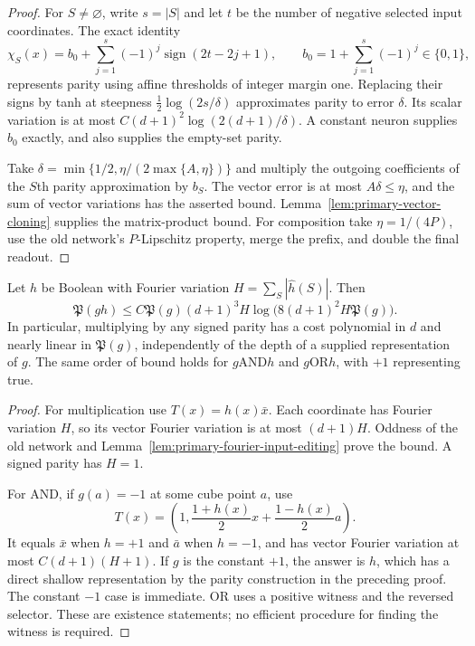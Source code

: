 \begin{proof}
For $S\ne\varnothing$, write $s=|S|$ and let $t$ be the number
of negative selected input coordinates. The exact identity
\[
 \chi_S(x)=b_0+\sum_{j=1}^{s}(-1)^j
                    \operatorname{sign}(2t-2j+1),
 \qquad b_0=1+\sum_{j=1}^{s}(-1)^j\in\{0,1\},
\]
represents parity using affine thresholds of integer margin one.
Replacing their signs by tanh at steepness
$\tfrac12\log(2s/\delta)$ approximates parity to error $\delta$.
Its scalar variation is at most
$C(d+1)^2\log(2(d+1)/\delta)$. A constant neuron supplies $b_0$
exactly, and also supplies the empty-set parity.

Take $\delta=\min\{1/2,\eta/(2\max\{A,\eta\})\}$ and
multiply the outgoing coefficients of the $S$th parity approximation
by $b_S$. The vector error is at most $A\delta\le\eta$, and
the sum of vector variations has the asserted bound.
Lemma~\ref{lem:primary-vector-cloning} supplies the matrix-product
bound. For composition take $\eta=1/(4P)$, use the old network's
$P$-Lipschitz property, merge the prefix, and double the final
readout.
\end{proof}

\begin{corollary}
\label{cor:primary-predicate-modulation}
Let $h$ be Boolean with Fourier variation
$H=\sum_S|\widehat h(S)|$. Then
\[
 \mathfrak P(gh)
 \le C\mathfrak P(g)(d+1)^3H
       \log\bigl(8(d+1)^2H\mathfrak P(g)\bigr).
\]
In particular, multiplying by any signed parity has a cost
polynomial in $d$ and nearly linear in $\mathfrak P(g)$,
independently of the depth of a supplied representation of $g$.
The same order of bound holds for $g\mathbin{\mathrm{AND}}h$
and $g\mathbin{\mathrm{OR}}h$, with $+1$ representing true.
\end{corollary}

\begin{proof}
For multiplication use $T(x)=h(x)\bar x$. Each coordinate has
Fourier variation $H$, so its vector Fourier variation is at most
$(d+1)H$. Oddness of the old network and
Lemma~\ref{lem:primary-fourier-input-editing} prove the bound.
A signed parity has $H=1$.

For AND, if $g(a)=-1$ at some cube point $a$, use
\[
 T(x)=\left(1,\frac{1+h(x)}2x+\frac{1-h(x)}2a\right).
\]
It equals $\bar x$ when $h=+1$ and $\bar a$ when $h=-1$,
and has vector Fourier variation at most $C(d+1)(H+1)$.
If $g$ is the constant $+1$, the answer is $h$, which has a direct
shallow representation by the parity construction in the preceding
proof. The constant $-1$ case is immediate. OR uses a positive
witness and the reversed selector. These are existence statements;
no efficient procedure for finding the witness is required.
\end{proof}

